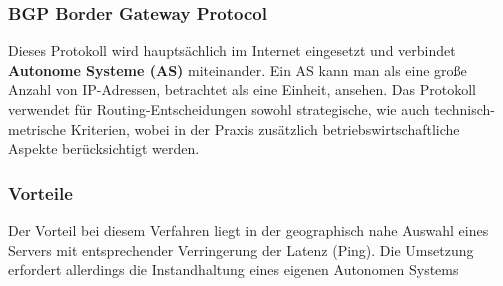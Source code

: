 \subsubsection{BGP Border Gateway Protocol}\cite{BGP}
Dieses Protokoll wird hauptsächlich im Internet eingesetzt und verbindet\textbf{ Autonome Systeme (AS)} miteinander. Ein AS kann man als eine große Anzahl von IP-Adressen, betrachtet als eine Einheit, ansehen. Das Protokoll verwendet für Routing-Entscheidungen sowohl strategische, wie auch technisch-metrische Kriterien, wobei in der Praxis zusätzlich betriebswirtschaftliche Aspekte berücksichtigt werden.

\subsubsection{Vorteile}
Der Vorteil bei diesem Verfahren liegt in der geographisch nahe Auswahl eines Servers mit entsprechender Verringerung der Latenz (Ping). Die Umsetzung erfordert allerdings die Instandhaltung eines eigenen Autonomen Systems



